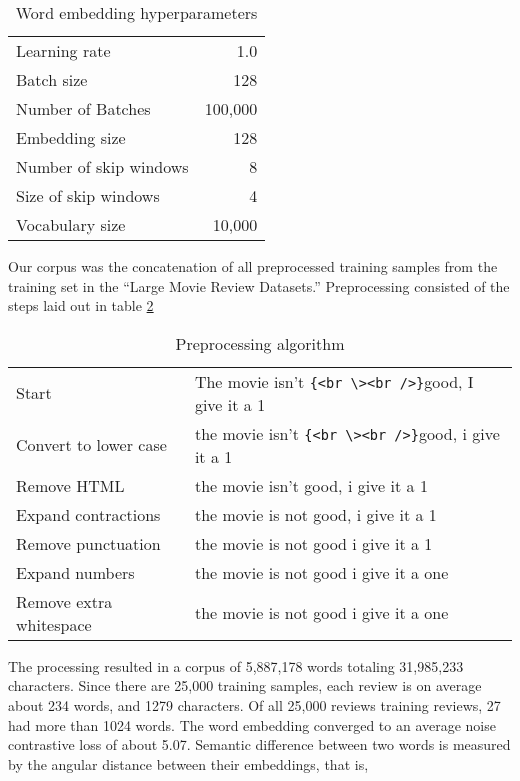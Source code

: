 \begin{table}[h]
\centering
\begin{tabular}{ l | r }
    \hline
    Learning rate & 1.0 \\
    Batch size & 128 \\
    Number of Batches & 100,000 \\
    Embedding size & 128 \\
    Number of skip windows & 8 \\
    Size of skip windows & 4 \\
    Vocabulary size & 10,000 \\
    \hline
\end{tabular}
\caption{Word embedding hyperparameters}
\label{tab:embedding_hperparameters}
\end{table}

Our corpus was the concatenation of all preprocessed training samples from the training set in the ``Large Movie Review Datasets.'' \cite{am11}  Preprocessing consisted of the steps laid out in table \ref{tab:preproc}

\begin{table}[h]
\centering
\begin{tabular}{ l | l }
    \hline
    Start & The movie isn't \verb|{<br \><br />}|good, I give it a 1\\
    Convert to lower case & the movie isn't \verb|{<br \><br />}|good, i give it a 1\\
    Remove HTML & the movie isn't \space good, i give it a 1\\
    Expand contractions & the movie is not \space good, i give it a 1\\
    Remove punctuation & the movie is not \space good i give it a 1\\
    Expand numbers & the movie is not \space good i give it a one\\
    Remove extra whitespace & the movie is not good i give it a one\\
    \hline
\end{tabular}
\caption{Preprocessing algorithm}
\label{tab:preproc}
\end{table}

The processing resulted in a corpus of 5,887,178 words totaling 31,985,233 characters.  Since there are 25,000 training samples, each review is on average about 234 words, and 1279 characters.  Of all 25,000 reviews training reviews, 27 had more than 1024 words.  The word embedding converged to an average noise contrastive loss of about 5.07.   Semantic difference between two words is measured by the angular distance between their embeddings, that is,

